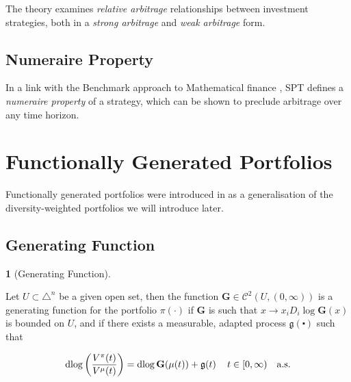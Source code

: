 \documentclass[british]{amsart} \usepackage{lmodern}
\numberwithin{equation}{section} \numberwithin{figure}{section}
\theoremstyle{plain} \newtheorem{thm}{\protect\theoremname}[section]
\theoremstyle{definition} \newtheorem{defn}[thm]{\protect\definitionname}
\theoremstyle{plain} \newtheorem{assumption}[thm]{\protect\assumptionname}
\theoremstyle{plain} \newtheorem{lem}[thm]{\protect\lemmaname}
\theoremstyle{plain} \newtheorem{prop}[thm]{\protect\propositionname}
\theoremstyle{remark} \newtheorem{rem}[thm]{\protect\remarkname}
\theoremstyle{plain} \newtheorem{cor}[thm]{\protect\corollaryname}
\renewcommand{\d}[1]{\mathop{\mathrm{d}{#1}}}
\begin{document}
The theory examines \textit{relative arbitrage} relationships between investment
strategies, both in a \textit{strong arbitrage} and \textit{weak arbitrage}
form.

\subsection{Numeraire Property}

In a link with the Benchmark approach to Mathematical finance
\cite{platen2006}, SPT defines a \textit{numeraire property} of a strategy,
which can be shown to preclude arbitrage over any time horizon.

\section{Functionally Generated Portfolios}

Functionally generated portfolios were introduced in \cite{fernholz1999pgf} as a
generalisation of the diversity-weighted portfolios we will introduce later.

\subsection{Generating Function}

\newcommand{\G}{\mathbf{G}}

\begin{defn} [Generating Function] 
  \label{def:generatingfunction}

  Let $U \subset \triangle^{n}$ be a given open set, then the function
  $\G\in\mathcal{C}^{2}(U,(0,\infty))$ is a generating function for the
  portfolio $\pi(\cdot)$ if $\G$ is such that $x\to
  x_{i}D_{i}\log\G(x)$ is bounded on $U$, and if there exists a
  measurable, adapted process $\mathfrak{g}(\centerdot)$ such that 

  \begin{equation}
    \d{ \log \left( \frac{V^{\pi}(t)}{V^{\mu}(t)} \right) } = 
    \d{ \log \G(\mu(t)) + \mathfrak{g}(t) }
    \quad \ranget
    \quad \almostsurely
  \end{equation}


\end{defn}
\end{document}
